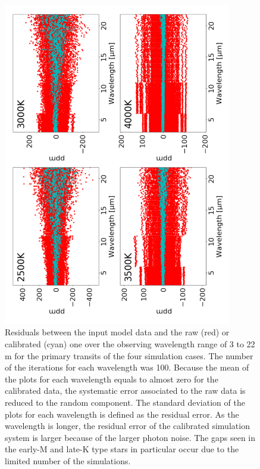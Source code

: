 \documentclass{aastex62}
\begin{document}
\begin{figure}[H]
\begin{center}
\includegraphics[angle=270, width=10cm]{systematic_error.pdf}
\caption{Residuals between the input model data and the raw (red) or calibrated (cyan) one over the observing wavelength range of 3 to 22 \textmu m for the primary transits of the four simulation cases. The number of the iterations for each wavelength was 100. Because the mean of the plots for each wavelength equals to almost zero for the calibrated data, the systematic error associated to the raw data is reduced to the random component. The standard deviation of the plots for each wavelength is defined as the residual error. As the wavelength is longer, the residual error of the calibrated simulation system is larger because of the larger photon noise. The gaps seen in the early-M and late-K type stars in particular occur due to the limited number of the simulations. \label{fig:error}}
\end{center}
\end{figure}
\end{document}
